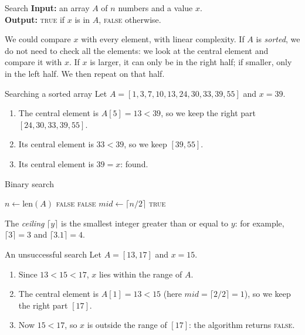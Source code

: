 \documentclass[a4paper,12pt,oneside]{report}
\begin{document}
\begin{framedproblem}{Search}\label{prob:search}
\textbf{Input:} an array $A$ of $n$ numbers and a value $x$.\\
\textbf{Output:} \textsc{true} if $x$ is in $A$, \textsc{false}
otherwise.
\end{framedproblem}

We could compare $x$ with every element, with linear complexity.
If $A$ is \emph{sorted}, we do not need to check all the elements: we
look at the central element and compare it with $x$. If $x$ is larger,
it can only be in the right half; if smaller, only in the left half.
We then repeat on that half.

\begin{framedexample}{Searching a sorted array}\label{ex:binary-search}
Let $A=[1,3,7,10,13,24,30,33,39,55]$ and $x=39$.
\begin{enumerate}
  \item The central element is $A[5]=13<39$, so we keep the right part
    $[24,30,33,39,55]$.
  \item Its central element is $33<39$, so we keep $[39,55]$.
  \item Its central element is $39=x$: found.
\end{enumerate}
\end{framedexample}

\begin{framedalgo}{Binary search}\label{alg:binary-search}
\begin{algorithmic}[1]
    \State $n\gets\mathrm{len}(A)$
      \State \Return \textsc{false}
    \EndIf
     
      \State \Return \textsc{false}
    \EndIf
    \State $\mathit{mid}\gets\lceil n/2\rceil$
      \State \Return \textsc{true}
      \State \Return {}
    \Else
      \State \Return {}
    \EndIf
  \EndFunction
\end{algorithmic}
\end{framedalgo}

The \emph{ceiling} $\lceil y\rceil$ is the smallest integer greater
than or equal to $y$: for example, $\lceil3\rceil=3$ and
$\lceil3.1\rceil=4$.

\begin{framedexample}{An unsuccessful search}\label{ex:binary-search-fail}
Let $A=[13,17]$ and $x=15$.
\begin{enumerate}
  \item Since $13<15<17$, $x$ lies within the range of $A$.
  \item The central element is $A[1]=13<15$ (here
    $\mathit{mid}=\lceil2/2\rceil=1$), so we keep the right part $[17]$.
  \item Now $15<17$, so $x$ is outside the range of $[17]$: the
    algorithm returns \textsc{false}.
\end{enumerate}
\end{framedexample}
\end{document}
